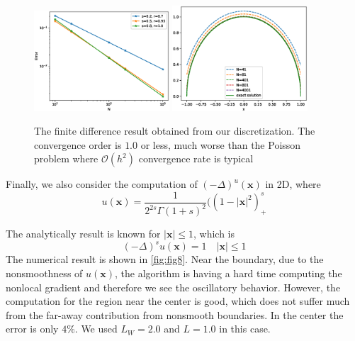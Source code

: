 \documentclass[3p,,preprint,12pt]{elsarticle}
\newcommand{\bx}[0]{\mathbf{x}}
\theoremstyle{definition}
\begin{document}
\begin{figure}[H] %
\centering
\includegraphics[width=0.45\textwidth,keepaspectratio]{figures/fig6}
\includegraphics[width=0.45\textwidth,keepaspectratio]{figures/fig7}
\caption{The finite difference result obtained from our discretization. The convergence order is $1.0$ or less, much worse than the Poisson problem where $\mathcal{O}(h^2)$ convergence rate is typical}
\label{fig:fig6}
\end{figure}

Finally, we also consider the computation of $(-\Delta)^ u(\bx)$ in 2D, where
\begin{equation}
	u(\bx) = \frac{1}{2^{2s}\Gamma(1+s)^2} ((1-|\bx|^2)^s_+
\end{equation}

The analytically result is known for $|\bx|\leq 1$, which is
\begin{equation}\label{equ:u1}
	(-\Delta)^s u(\bx) = 1\quad |\bx|\leq 1
\end{equation}
The numerical result is shown in \cref{fig:fig8}. Near the boundary, due to the nonsmoothness of $u(\bx)$, the algorithm is having a hard time computing the nonlocal gradient and therefore we see the oscillatory behavior. However, the computation for the region near the center is  good, which does not suffer much from the far-away contribution from nonsmooth boundaries. In the center the error is only $4\%$. We used $L_W=2.0$ and $L=1.0$ in this case.  
\end{document}
